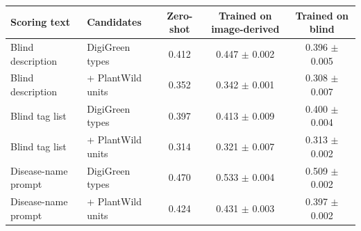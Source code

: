 \begin{tabular}{llccc}\toprule Scoring text & Candidates & Zero-shot & Trained on image-derived & Trained on blind\\\midrule
Blind description & DigiGreen types & 0.412 & 0.447 $\pm$ 0.002 & 0.396 $\pm$ 0.005\\
Blind description & + PlantWild units & 0.352 & 0.342 $\pm$ 0.001 & 0.308 $\pm$ 0.007\\
Blind tag list & DigiGreen types & 0.397 & 0.413 $\pm$ 0.009 & 0.400 $\pm$ 0.004\\
Blind tag list & + PlantWild units & 0.314 & 0.321 $\pm$ 0.007 & 0.313 $\pm$ 0.002\\
Disease-name prompt & DigiGreen types & 0.470 & 0.533 $\pm$ 0.004 & 0.509 $\pm$ 0.002\\
Disease-name prompt & + PlantWild units & 0.424 & 0.431 $\pm$ 0.003 & 0.397 $\pm$ 0.002\\
\bottomrule\end{tabular}
